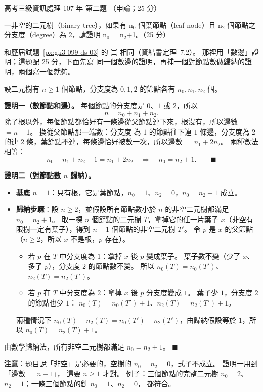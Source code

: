 \begin{pastexam}[label={px:gk3-107-ds-02}]{高考三級資訊處理 107 年 第二題}
（申論；25 分）

一非空的二元樹（binary tree），如果有 n$_0$ 個葉節點（leaf node）且 n$_2$ 個節點之分支度（degree）為 2，請證明
n$_0$ = n$_2$+1。（25 分）
\end{pastexam}

\begin{pastsoln}
和歷屆試題~\ref{px:gk3-099-ds-03} 的 ㈢ 相同（資結書定理~7.2）。 那裡用「數邊」證明；這題配 25 分，下面先寫
同一個數邊的證明，再補一個對節點數做歸納的證明，兩個寫一個就夠。

設二元樹有 $n \ge 1$ 個節點，分支度為 $0, 1, 2$ 的節點各有 $n_0, n_1, n_2$ 個。

\textbf{證明一（數節點和邊）。} 每個節點的分支度是 $0$、$1$ 或 $2$，所以
\[
n = n_0 + n_1 + n_2 .
\]
除了根以外，每個節點都恰好有一條邊從父節點連下來，根沒有，所以邊數 $= n - 1$。 換從父節點那一端數：分支度
為 $1$ 的節點往下連 $1$ 條邊，分支度為 $2$ 的連 $2$ 條，葉節點不連，每條邊恰好被數一次，所以邊數
$= n_1 + 2n_2$。 兩種數法相等：
\[
n_0 + n_1 + n_2 - 1 = n_1 + 2n_2 \quad\Longrightarrow\quad n_0 = n_2 + 1. \qquad\blacksquare
\]

\textbf{證明二（對節點數 $n$ 歸納）。}
\begin{itemize}
\item \textbf{基底} $n = 1$：只有根，它是葉節點，$n_0 = 1$、$n_2 = 0$，$n_0 = n_2 + 1$ 成立。
\item \textbf{歸納步驟}：設 $n \ge 2$，並假設所有節點數小於 $n$ 的非空二元樹都滿足 $n_0 = n_2 + 1$。 取一棵
$n$ 個節點的二元樹 $T$，拿掉它的任一片葉子 $x$（非空有限樹一定有葉子），得到 $n - 1$ 個節點的非空二元樹
$T'$。 令 $p$ 是 $x$ 的父節點（$n \ge 2$，所以 $x$ 不是根，$p$ 存在）。
\begin{itemize}
\item 若 $p$ 在 $T$ 中分支度為 $1$：拿掉 $x$ 後 $p$ 變成葉子。 葉子數不變（少了 $x$、多了 $p$），分支度 $2$
的節點數不變。 所以 $n_0(T) = n_0(T')$、$n_2(T) = n_2(T')$。
\item 若 $p$ 在 $T$ 中分支度為 $2$：拿掉 $x$ 後 $p$ 分支度變成 $1$。 葉子少 $1$，分支度 $2$ 的節點也少 $1$：
$n_0(T) = n_0(T') + 1$、$n_2(T) = n_2(T') + 1$。
\end{itemize}
兩種情況下 $n_0(T) - n_2(T) = n_0(T') - n_2(T')$，由歸納假設等於 $1$，所以 $n_0(T) = n_2(T) + 1$。
\end{itemize}
由數學歸納法，所有非空二元樹都滿足 $n_0 = n_2 + 1$。 \hfill$\blacksquare$

\textbf{注意}：題目說「非空」是必要的，空樹的 $n_0 = n_2 = 0$，式子不成立。 證明一用到「邊數 $= n - 1$」，
這要 $n \ge 1$ 才對。 例子：三個節點的完整二元樹 $n_0 = 2$、$n_2 = 1$；一條三個節點的鏈 $n_0 = 1$、$n_2 = 0$，
都符合。
\end{pastsoln}
